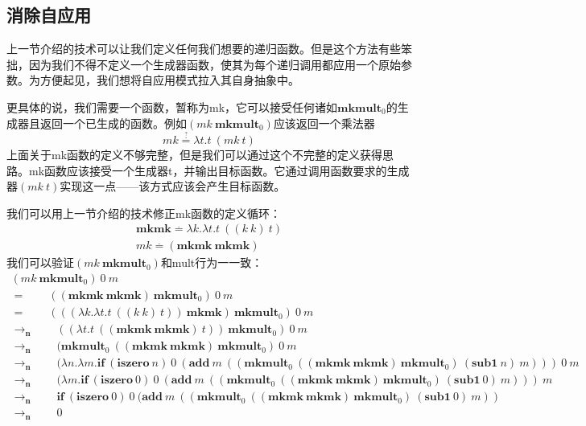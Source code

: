 \documentclass{book}
\begin{document}
\subsection{消除自应用}
上一节介绍的技术可以让我们定义任何我们想要的递归函数。但是这个方法有些笨拙，因为我们不得不定义一个生成器函数，使其为每个递归调用都应用一个原始参数。为方便起见，我们想将自应用模式拉入其自身抽象中。\par
更具体的说，我们需要一个函数，暂称为mk，它可以接受任何诸如$\mathbf{mkmult}_0$的生成器且返回一个已生成的函数。例如$(mk\ \mathbf{mkmult}_0)$应该返回一个乘法器
$$
mk \stackrel{\stackrel{?}{.}}{=}\lambda t.t\ (mk\ t)
$$
上面关于mk函数的定义不够完整，但是我们可以通过这个不完整的定义获得思路。mk函数应该接受一个生成器t，并输出目标函数。它通过调用函数要求的生成器$(mk\ t)$实现这一点——该方式应该会产生目标函数。\par
我们可以用上一节介绍的技术修正mk函数的定义循环：
$$
\begin{array}{c}
\mathbf{mkmk}\stackrel{.}{=}\lambda k.\lambda t.t\ ((k\ k)\ t)\\
mk\stackrel{.}{=}(\mathbf{mkmk}\ \mathbf{mkmk})
\end{array}
$$
我们可以验证$(mk\ \mathbf{mkmult}_0)$和mult行为一一致：
$$
\begin{array}{l}
(mk\ \mathbf{mkmult}_0)\ 0\ m\\
=\qquad((\mathbf{mkmk}\ \mathbf{mkmk})\ \mathbf{mkmult}_0)\ 0\ m\\
=\qquad(((\lambda k.\lambda t.t\ ((k\ k)\ t))\ \mathbf{mkmk})\ \mathbf{mkmult}_0)\ 0\ m\\
\rightarrow_\textbf{n}\qquad((\lambda t.t\ ((\mathbf{mkmk}\ \mathbf{mkmk})\ t))\ \mathbf{mkmult}_0)\ 0\ m\\
\rightarrow_\textbf{n}\qquad(\mathbf{mkmult}_0\ ((\mathbf{mkmk}\ \mathbf{mkmk})\ \mathbf{mkmult}_0)\ 0\ m\\
\rightarrow_\textbf{n}\qquad(\lambda n.\lambda m.\mathbf{if}\ (\mathbf{iszero}\ n)\ 0\ (\mathbf{add}\ m\ ((\mathbf{mkmult}_0\ ((\mathbf{mkmk}\ \mathbf{mkmk})\ \mathbf{mkmult}_0)\ (\mathbf{sub1}\ n)\ m)))\ 0\ m\\
\rightarrow_\textbf{n}\qquad(\lambda m.\mathbf{if}\ (\mathbf{iszero}\ 0)\ 0\ (\mathbf{add}\ m\ ((\mathbf{mkmult}_0\ ((\mathbf{mkmk}\ \mathbf{mkmk})\ \mathbf{mkmult}_0)\ (\mathbf{sub1}\ 0)\ m)))\ m\\
\rightarrow_\textbf{n}\qquad \mathbf{if}\ (\mathbf{iszero}\ 0)\ 0\ (\mathbf{add}\ m\ ((\mathbf{mkmult}_0\ ((\mathbf{mkmk}\ \mathbf{mkmk})\ \mathbf{mkmult}_0)\ (\mathbf{sub1}\ 0)\ m))\\
\rightarrow_\textbf{n}\qquad 0\\
\end{array}
$$
\end{document}
